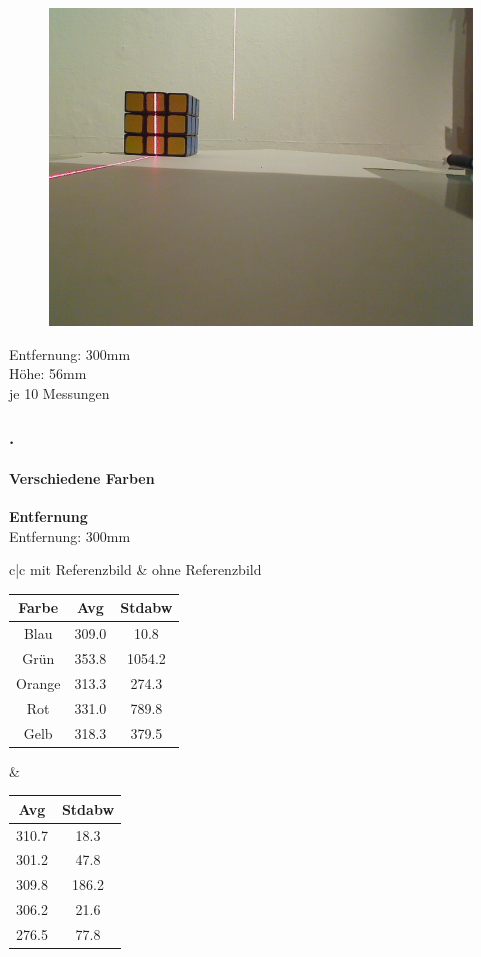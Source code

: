 \documentclass[xcolor=dvipsnames]{beamer}
\def\frametitlesec{\frametitle{\arabic{section}.\hspace{0.5ex}\insertsection}}
\def\framesubtitles#1{\framesubtitle{\hspace{3.5ex}#1}}
\begin{document}
\begin{frame}
\begin{figure}
\begin{minipage}{0.32\linewidth}
			\includegraphics[width=\linewidth]{includes/test_color_3}
		\end{minipage}
	\end{figure}
	
	Entfernung: 300mm\\
	Höhe: 56mm\\
	je 10 Messungen
	
\end{frame}

\begin{frame}
	\frametitlesec
	\framesubtitles{Verschiedene Farben}
		\textbf{Entfernung}\\

		Entfernung: 300mm
		
		\begin{tabular}{c|c}		
		mit Referenzbild & ohne Referenzbild\\
		\begin{tabular}{c|c|c}
Farbe  & Avg & Stdabw\\ \hline
Blau   & 309.0 & 10.8\\
Grün   & 353.8 & 1054.2\\
Orange & 313.3 & 274.3\\
Rot    & 331.0 & 789.8\\
Gelb   & 318.3 & 379.5\\
		\end{tabular}
		
		& 
		
		\begin{tabular}{c|c}
Avg & Stdabw\\ \hline
310.7 & 18.3\\
301.2 & 47.8\\
309.8 & 186.2\\
306.2 & 21.6\\
276.5 & 77.8\\
		\end{tabular}
		
		\end{tabular}
\end{frame}
\end{document}
